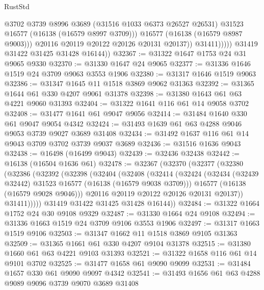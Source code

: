 \begin{lexlean}{RustStd}
\begin{coremodule}
                          @3702
                          @3739
                          @8996
                          @3689
                          (@31516 @1033 @6373 @26527 @26531)
                          @31523
                          @16577
                          (@16138 (@16579 @8997 @3709)))
                        @16577
                        (@16138 (@16579 @8987 @9003)))
                      @20116
                      @20119
                      @20122
                      @20126
                      @20131
                      @20137))
                  @31411)))))
        @31419
        @31422
        @31425
        @31428
        @16144))
@32367 := @31322 @1647 @1753 @24 @31 @9065 @9330
@32370 := @31330 @1647 @24 @9065
@32377 := @31336 @1646 @1519 @24 @3709 @9063 @3553 @1906
@32380 := @31317 @1646 @1519 @9063
@32386 := @31347 @1645 @11 @1518 @3869 @9062 @31363
@32392 := @31365 @1644 @61 @330 @4207 @9061 @31378
@32398 := @31380 @1643 @61 @63 @4221 @9060 @31393
@32404 := @31322 @1641 @116 @61 @14 @9058 @3702
@32408 := @31477 @1641 @61 @9047 @9056
@32414 := @31484 @1640 @330 @61 @9047 @9054 @4342
@32424 := @31493 @1639 @61 @63 @4288 @9046 @9053 @3739 @9027 @3689 @31408
@32434 := @31492 @1637 @116 @61 @14 @9043 @3709 @3702 @3739 @9037 @3689
@32436 := @31516 @1636 @9043
@32438 := @16498 (@16499 @9043)
@32439 := @32436 @32438
@32442 := @16138 (@16504 @1636 @61)
@32478 := @32367
    (@32370
      (@32377
        (@32380
          (@32386
            (@32392
              (@32398
                (@32404
                  (@32408
                    (@32414
                      (@32424
                        (@32434 (@32439 @32442) @31523 @16577 (@16138 (@16579 @9038 @3709)))
                        @16577
                        (@16138 (@16579 @9028 @9046)))
                      @20116
                      @20119
                      @20122
                      @20126
                      @20131
                      @20137))
                  @31411)))))
        @31419
        @31422
        @31425
        @31428
        @16144))
@32484 := @31322 @1664 @1752 @24 @30 @9108 @9329
@32487 := @31330 @1664 @24 @9108
@32494 := @31336 @1663 @1519 @24 @3709 @9106 @3553 @1906
@32497 := @31317 @1663 @1519 @9106
@32503 := @31347 @1662 @11 @1518 @3869 @9105 @31363
@32509 := @31365 @1661 @61 @330 @4207 @9104 @31378
@32515 := @31380 @1660 @61 @63 @4221 @9103 @31393
@32521 := @31322 @1658 @116 @61 @14 @9101 @3702
@32525 := @31477 @1658 @61 @9090 @9099
@32531 := @31484 @1657 @330 @61 @9090 @9097 @4342
@32541 := @31493 @1656 @61 @63 @4288 @9089 @9096 @3739 @9070 @3689 @31408

\end{coremodule}
\end{lexlean}
